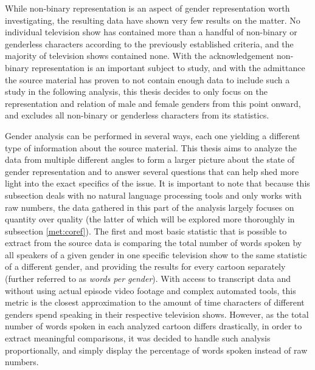 \documentclass[a4paper, 11pt]{article}
\begin{document}
While non-binary representation is an aspect of gender representation worth investigating, the resulting data have shown very few results on the matter. No individual television show has contained more than a handful of non-binary or genderless characters according to the previously established criteria, and the majority of television shows contained none. With the acknowledgement non-binary representation is an important subject to study, and with the admittance the source material has proven to not contain enough data to include such a study in the following analysis, this thesis decides to only focus on the representation and relation of male and female genders from this point onward, and excludes all non-binary or genderless characters from its statistics.

Gender analysis can be performed in several ways, each one yielding a different type of information about the source material. This thesis aims to analyze the data from multiple different angles to form a larger picture about the state of gender representation and to answer several questions that can help shed more light into the exact specifics of the issue. It is important to note that because this subsection deals with no natural language processing tools and only works with raw numbers, the data gathered in this part of the analysis largely focuses on quantity over quality (the latter of which will be explored more thoroughly in subsection \ref{met:coref}). The first and most basic statistic that is possible to extract from the source data is comparing the total number of words spoken by all speakers of a given gender in one specific television show to the same statistic of a different gender, and providing the results for every cartoon separately (further referred to as \textit{words per gender}). With access to transcript data and without using actual episode video footage and complex automated tools, this metric is the closest approximation to the amount of time characters of different genders spend speaking in their respective television shows. However, as the total number of words spoken in each analyzed cartoon differs drastically, in order to extract meaningful comparisons, it was decided to handle such analysis proportionally, and simply display the percentage of words spoken instead of raw numbers.
\end{document}
